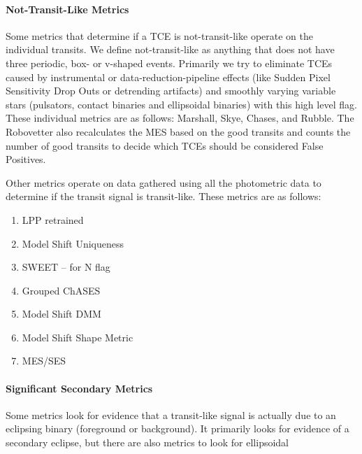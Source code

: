 \documentclass[onecolumn]{aastex6}
\begin{document}
\paragraph{Not-Transit-Like Metrics} 
Some metrics that determine if a TCE is not-transit-like operate on the individual transits. We define not-transit-like as anything that does not have three periodic, box- or v-shaped events. Primarily we try to eliminate TCEs caused by instrumental or data-reduction-pipeline effects (like Sudden Pixel Sensitivity Drop Outs or detrending artifacts) and smoothly varying variable stars (pulsators, contact binaries and ellipsoidal binaries) with this high level flag.   These individual metrics are as follows: Marshall, Skye, Chases, and Rubble. The Robovetter also recalculates the MES based on the good transits and counts the number of good transits to decide which TCEs should be considered False Positives. 


%

Other metrics operate on data gathered using all the photometric data to determine if the transit signal is transit-like.  These metrics are as follows:

\begin{enumerate}
\item LPP retrained
\item Model Shift Uniqueness
\item SWEET -- for N flag
\item Grouped ChASES
\item Model Shift DMM
\item Model Shift Shape Metric
\item MES/SES

\end{enumerate}

\paragraph{Significant Secondary Metrics}
Some metrics look for evidence that a transit-like signal is actually due to an eclipsing binary (foreground or background).  It primarily looks for evidence of a secondary eclipse, but there are also metrics to look for ellipsoidal
\end{document}
